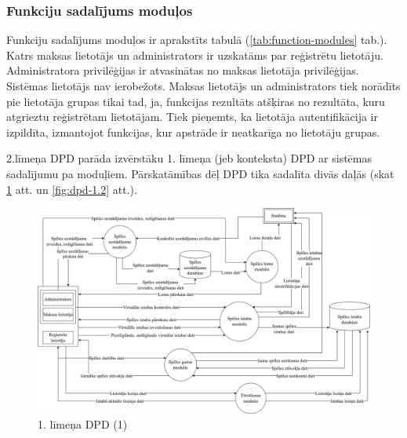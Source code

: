 \subsubsection{Funkciju sadalījums moduļos}
Funkciju sadalījums moduļos ir aprakstīts tabulā (\ref{tab:function-modules} tab.).
Katrs maksas lietotājs un administrators ir uzskatāms par reģistrētu lietotāju.
Administratora privilēģijas ir atvasinātas no maksas lietotāja privilēģijas.
Sistēmas lietotājs nav ierobežots.
Maksas lietotājs un administrators tiek norādīts pie lietotāja grupas tikai tad, ja, funkcijas rezultāts atšķiras no rezultāta, kuru atgrieztu reģistrētam lietotājam.
Tiek pieņemts, ka lietotāja autentifikācija ir izpildīta, izmantojot funkcijas, kur apstrāde ir neatkarīga no lietotāju grupas.

2.līmeņa DPD parāda izvērstāku 1. līmeņa (jeb konteksta) DPD ar sistēmas sadalījumu pa moduļiem.
Pārskatāmības dēļ DPD tika sadalīta divās daļās (skat \ref{fig:dpd-1.1} att. un \ref{fig:dpd-1.2} att.).


\begin{figure}[htbp]
	\centering
	\includegraphics[width=\linewidth]{./src/img/1LīmeņaDPDSpēlesDatubāze.png}
	\caption{1. līmeņa DPD (1)}
	\label{fig:dpd-1.1}
\end{figure}

